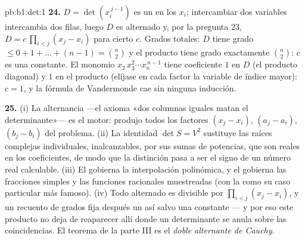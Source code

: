 \begin{solution}{pb:b1:det:1}
\textbf{24.} $D = \det(x_i^{\,j-1})$ es un  en los $x_i$;
intercambiar dos variables intercambia dos filas, luego $D$ es
alternado y, por la pregunta 23, $D = c\,\prod_{i<j}(x_j - x_i)$ para
cierto  $c$. Grados totales: $D$ tiene grado
$\leq 0 + 1 + \dots + (n-1) = \binom n2$ y el producto tiene grado
exactamente $\binom n2$: $c$ es una constante. El monomio
$x_2\,x_3^2\cdots x_n^{\,n-1}$ tiene coeficiente $1$ en $D$ (el
producto diagonal) y $1$ en el producto (elíjase en cada factor la
variable de índice mayor): $c = 1$, y la fórmula de Vandermonde cae
sin ninguna inducción.

\textbf{25.} (i) La alternancia ---el axioma «dos columnas iguales
matan el determinante»--- es el motor: produjo todos los factores
$(x_j - x_i)$, $(a_j - a_i)$, $(b_j - b_i)$ del problema. (ii) La
identidad $\det S = V^2$ sustituye las raíces complejas
individuales, inalcanzables, por sus sumas de potencias, que son
 reales en los coeficientes, de modo que la distinción
pasa a ser el signo de un número real calculable. (iii) El
 gobierna la interpolación
polinómica, y el  gobierna las fracciones
simples y las funciones racionales muestreadas (con la
 como su caso particular más famoso). (iv) Todo
 alternado es divisible por $\prod_{i<j}(x_j - x_i)$, y un
recuento de grados fija después un  así salvo una constante
--- y por eso este producto no deja de reaparecer allí donde un
determinante se anula sobre las coincidencias. El teorema de la
parte III es el \emph{doble alternante de Cauchy}.
\end{solution}
